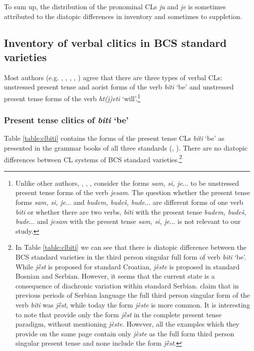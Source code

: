 To sum up, the distribution of the pronominal CLs \textit{ju} and \textit{je} is sometimes attributed to the diatopic differences in inventory and sometimes to suppletion.

\subsection{Inventory of verbal clitics in BCS standard varieties}
\label{Inventory of verbal clitics in BCS standard varieties}
Most authors (e.g. \citealt[72]{TezakBabic96}, \citealt[72]{Baric97}, \citealt[284]{Popovic04}, \citealt[21]{SilicPranjkovic07}, \citealt[28]{PiperKlajn14}) agree that there are three types of verbal CLs: unstressed present tense and aorist forms of the verb \textit{biti} `be' and unstressed present tense forms of the verb \textit{ht(j)eti} `will'.\footnote{Unlike other authors, \citet[350]{Stevanovic75}, \citet[97]{StanojcicPopovic02}, \citet{MrazovicVukadinovic09}, \citet[271]{JHP00} consider the forms \textit{sam, si, je}... to be unstressed present tense forms of the verb \textit{jesam}. The question whether the present tense forms \textit{sam, si, je}... and \textit{budem, budeš, bude}... are different forms of one verb \textit{biti} or whether there are two verbs, \textit{biti} with the present tense \textit{budem, budeš, bude}... and \textit{jesam} with the present tense \textit{sam, si, je}... is not relevant to our study.}

\subsubsection{Present tense clitics of \textit{biti} `be'}

Table \ref{table:clbiti} contains the forms of the present tense CLs \textit{biti} `be' as presented in the grammar books of all three standards (\citealt[cf.][271]{Baric97}, \citealt[128]{MrazovicVukadinovic09}). There are no diatopic differences between CL systems of BCS standard varieties.\footnote{In Table \ref{table:clbiti} we can see that there is diatopic difference between the BCS standard varieties in the third person singular full form of verb \textit{biti} `be'. While \textit{jȅst} is proposed for standard Croatian, \textit{jèste} is proposed in standard Bosnian and Serbian. However, it seems that the current state is a consequence of diachronic variation within standard Serbian. \citet[198]{PiperKlajn14} claim that in previous periods of Serbian language the full third person singular form of the verb \textit{biti} was \textit{jȅst}, while today the form \textit{jèste} is more common. It is interesting to note that \citet[128]{MrazovicVukadinovic09} provide only the form \textit{jȅst} in the complete present tense paradigm, without mentioning \textit{jèste}. However, all the examples which they provide on the same page contain only \textit{jèste} as the full form third person singular present tense and none include the form \textit{jȅst}.}


